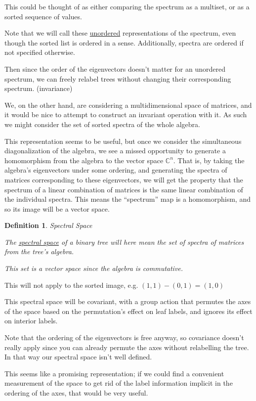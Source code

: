 \documentclass[10pt,a4paper]{report}
\newcommand{\C}{\mathbb{C}}
\newtheorem{definition}{Definition}
\begin{document}
This could be thought of as either comparing the spectrum as a multiset, or as
a sorted sequence of values.

Note that we will call these \underline{unordered} representations of the
spectrum, even though the sorted list is ordered in a sense. Additionally,
spectra are ordered if not specified otherwise.

Then since the order of the eigenvectors doesn't matter for an unordered
spectrum, we can freely relabel trees without changing their corresponding
spectrum. (invariance)

We, on the other hand, are considering a multidimensional space of matrices,
and it would be nice to attempt to construct an invariant operation with it.
As such we might consider the set of sorted spectra of the whole algebra.

This representation seems to be useful, but once we consider the simultaneous
diagonalization of the algebra, we see a missed opportunity to generate a
homomorphism from the algebra to the vector space $\C^n$.
That is, by taking the algebra's eigenvectors under some ordering, and
generating the spectra of matrices corresponding to these eigenvectors, we
will get the property that the spectrum of a linear combination of matrices is
the same linear combination of the individual spectra.
This means the ``spectrum'' map is a homomorphism, and so its image will be a
vector space.

\begin{definition}Spectral Space

	The \underline{spectral space} of a binary tree will here mean the set of
	spectra of matrices from the tree's algebra.

	This set is a vector space since the algebra is commutative.
\end{definition}


This will not apply to the sorted image, e.g. $(1, 1) - (0, 1) = (1, 0)$

This spectral space will be covariant, with a group action that permutes the
axes of the space based on the permutation's effect on leaf labels, and ignores
its effect on interior labels.

Note that the ordering of the eigenvectors is free anyway, so covariance
doesn't really apply since you can already permute the axes without relabelling
the tree.  In that way our spectral space isn't well defined.

This seems like a promising representation; if we could find a convenient
measurement of the space to get rid of the label information implicit in the
ordering of the axes, that would be very useful.
\end{document}
